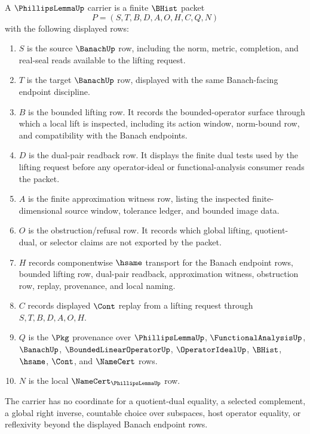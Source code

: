 \begin{definition}
\label{def:phillips-lemma-carrier}
A $\PhillipsLemmaUp$ carrier is a finite $\BHist$ packet
$$
P=(S,T,B,D,A,O,H,C,Q,N)
$$
with the following displayed rows:
\begin{enumerate}
\item $S$ is the source $\BanachUp$ row, including the norm, metric, completion, and real-seal reads available to the lifting request.
\item $T$ is the target $\BanachUp$ row, displayed with the same Banach-facing endpoint discipline.
\item $B$ is the bounded lifting row. It records the bounded-operator surface through which a local lift is inspected, including its action window, norm-bound row, and compatibility with the Banach endpoints.
\item $D$ is the dual-pair readback row. It displays the finite dual tests used by the lifting request before any operator-ideal or functional-analysis consumer reads the packet.
\item $A$ is the finite approximation witness row, listing the inspected finite-dimensional source window, tolerance ledger, and bounded image data.
\item $O$ is the obstruction/refusal row. It records which global lifting, quotient-dual, or selector claims are not exported by the packet.
\item $H$ records componentwise $\hsame$ transport for the Banach endpoint rows, bounded lifting row, dual-pair readback, approximation witness, obstruction row, replay, provenance, and local naming.
\item $C$ records displayed $\Cont$ replay from a lifting request through $S,T,B,D,A,O,H$.
\item $Q$ is the $\Pkg$ provenance over $\PhillipsLemmaUp$, $\FunctionalAnalysisUp$, $\BanachUp$, $\BoundedLinearOperatorUp$, $\OperatorIdealUp$, $\BHist$, $\hsame$, $\Cont$, and $\NameCert$ rows.
\item $N$ is the local $\NameCert_{\PhillipsLemmaUp}$ row.
\end{enumerate}
The carrier has no coordinate for a quotient-dual equality, a selected complement, a global right inverse, countable choice over subspaces, host operator equality, or reflexivity beyond the displayed Banach endpoint rows.
\end{definition}

